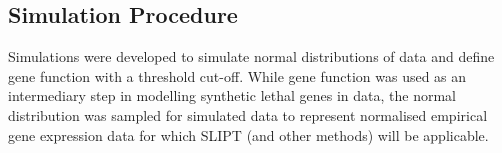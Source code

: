 \subsection{Simulation Procedure} \label{methods:simulating_SL}

Simulations were developed to simulate normal distributions of  data and define gene function with a threshold cut-off. 
While gene function was used as an intermediary step in modelling \gls{synthetic lethal} genes in  data, the normal distribution was sampled for simulated data to represent normalised empirical \gls{gene expression} data for which \gls{SLIPT} (and other methods) will be applicable.

